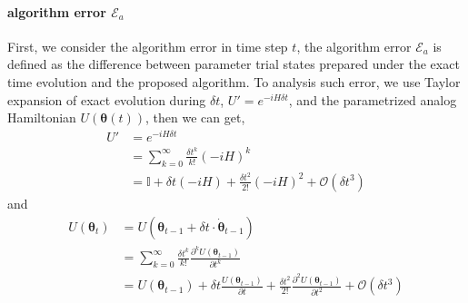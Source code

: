 \documentclass[twocolumn,
pra,aps,superscriptaddress,showpacs,amsmath,amssymb]{revtex4-2}
\begin{document}
\paragraph{algorithm error $\mathcal{E}_a$}
First, we consider the algorithm error in time step $t$, the algorithm error $\mathcal{E}_a$ is defined as the difference between parameter trial states prepared under the exact time evolution and the proposed algorithm. To analysis such error, we use Taylor expansion of exact evolution during $\delta t$, $U' = e^{-iH\delta t}$, and the parametrized analog Hamiltonian $U(\bm{\theta}(t))$, then we can get,
\begin{align}\label{eq:expan_u'}
U' &= e^{-iH\delta t} \\
&= \sum_{k=0}^\infty \frac{\delta t^k}{k!}(-i H)^k\\
& = \mathbb{I} + \delta t (-i H) + \frac{\delta t^2}{2!}(-i H )^2+\mathcal{O}(\delta t^3)
\end{align}
and
\begin{align}\label{eq:expan_u}
U(\bm{\theta}_t) &= U(\bm{\theta}_{t-1}+ \delta t \cdot \dot{\bm{\theta}}_{t-1})\\
& = \sum_{k=0}^\infty \frac{\delta t^k}{k!}\frac{\partial^k U(\bm{\theta}_{t-1})}{\partial t^k}\\
& = U(\bm{\theta}_{t-1})+\delta t  \frac{U(\bm{\theta}_{t-1})}{\partial t} + \frac{\delta t^2}{2!}\frac{\partial^2 U(\bm{\theta}_{t-1})}{\partial t^2}+\mathcal{O}(\delta t^3)
\end{align}
\end{document}
